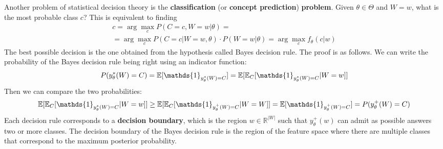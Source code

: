 Another problem of statistical decision theory is the \textbf{classification} (or \textbf{concept prediction}) \textbf{problem}. Given $\theta \in \Theta$ and $W = w$, what is the most probable class $c$? This is equivalent to finding
\begin{gather*}
    c = \arg \max_c P(C = c, W = w | \theta) = \\
    = \arg \max_c P(C = c | W = w, \theta) \cdot P(W = w | \theta) = \arg \max_c f_{\theta}(c|w)
\end{gather*}
The best possible decision is the one obtained from the hypothesis called Bayes decision rule.
The proof is as follows. We can write the probability of the Bayes decision rule being right using an indicator function:
\begin{equation*}
    P(y_{\theta}^*(W) = C) = \E[\mathds{1}_{y_{\theta}^*(W) = C}] = \E[\E_C[\mathds{1}_{y_{\theta}^*(W)=C}|W = w]]
\end{equation*}
Then we can compare the two probabilities:
\begin{equation*}
    \E[\E_C[\mathds{1}_{y_{\theta}^*(W)=C}|W = w]] \geq \E[\E_C[\mathds{1}_{y_{\theta}^+(W) = C}| W = W]] = \E[\mathds{1}_{y_{\theta}^+(W) = C}] = P(y_{\theta}^+(W) = C)
\end{equation*}
Each decision rule corresponds to a \textbf{decision boundary}, which is the region $w \in \mathbb{R}^{|W|}$ such that $y_{\theta}^+(w)$ can admit as possible answers two or more classes. The decision boundary of the Bayes decision rule is the region of the feature space where there are multiple classes that correspond to the maximum posterior probability.


